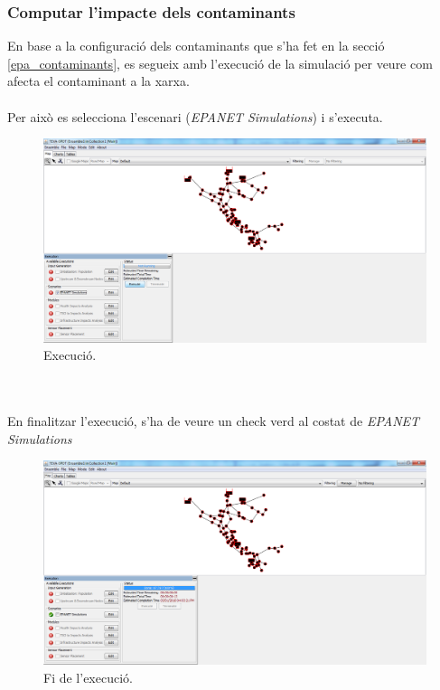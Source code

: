\documentclass[12pt]{article}
\begin{document}
\subsubsection{Computar l'impacte dels contaminants\label{epa_computar}}
En base a la configuració dels contaminants que s'ha fet en la secció \ref{epa_contaminants}, es segueix amb l'execució de la simulació per veure com afecta el contaminant a la xarxa.
\\\\Per això es selecciona l'escenari (\textit{EPANET Simulations}) i s'executa.
\begin{figure}[h!]
	\centering
	\includegraphics[scale=.4]{imatges/teva-spot/7.png}
	\caption{Execució.}
\end{figure}
\\\\En finalitzar l'execució, s'ha de veure un check verd al costat de \textit{EPANET Simulations}
\begin{figure}[h!]
	\centering
	\includegraphics[scale=.4]{imatges/teva-spot/8.png}
	\caption{Fi de l'execució.}
\end{figure}
\end{document}
